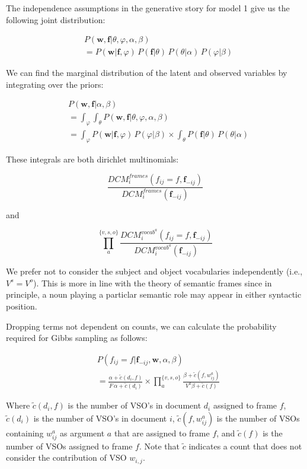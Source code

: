 \documentclass[11pt,twocolumn,DIV=11]{scrartcl}
\renewcommand\phi\varphi
\begin{document}
The independence assumptions in the generative story for model 1 give us the 
following joint distribution:

\begin{align*}
&P(\mathbf{w},\mathbf{f}|\theta,\phi,\alpha,\beta)\\
&=P(\mathbf{w}|\mathbf{f},\phi)\,P(\mathbf{f}|\theta)\,P(\theta|\alpha)\,P(\phi|\beta)
\end{align*}

We can find the marginal distribution of the latent and observed variables by
integrating over the priors:

\begin{align*}
& P(\mathbf{w},\mathbf{f}|\alpha,\beta)\\
&=\int_\phi\int_\theta P(\mathbf{w},\mathbf{f}|\theta,\phi,\alpha,\beta)\\
&=     \int_\phi P(\mathbf{w}|\mathbf{f},\phi )\,P(\phi|\beta)
\times \int_\theta P(\mathbf{f}|\theta)\,P(\theta|\alpha)
\end{align*}

These integrals are both dirichlet multinomials:

\[
\frac{DCM_i^{frames}(f_{ij}=f, \mathbf{f}_{-ij})}{DCM_i^{frames}(\mathbf{f}_{-ij})}
\]

and

\[
\prod_a^{\{v,s,o\}}\frac{DCM_i^{vocab^a}(f_{ij}=f, \mathbf{f}_{-ij})}{DCM_i^{vocab^a}(\mathbf{f}_{-ij})}
\]

We prefer not to consider the subject and object vocabularies independently 
(i.e., $V^s = V^o$). This is more in line with the theory of semantic frames 
since in principle, a noun playing a particlar semantic role may appear in either 
syntactic position.

Dropping terms not dependent on counts, we can calculate the probability 
required for Gibbs sampling as follows:

\begin{align}
& P(f_{ij} = f|\mathbf{f}_{-ij},\mathbf{w}, \alpha,\beta)\nonumber\\
&=\frac{\alpha + \tilde c(d_i,f)}{F\,\alpha + \tilde c(d_i)}
\times \prod_a^{\{v,s,o\}}\frac{\beta+\tilde c(f,w_{ij}^a)}{V^a\beta+\tilde c(f)}
\end{align}

Where $\tilde c (d_i, f)$ is the number of VSO's in document $d_i$ assigned to frame $f$,
$\tilde c(d_i)$ is the number of VSO's in document $i$,
$\tilde c(f,w_{ij}^a)$ is the number of VSOs containing $w_{ij}^a$ as argument $a$ that are
assigned to frame $f$, and
$\tilde c(f)$ is the number of VSOs assigned to frame $f$.
Note that $\tilde c$ indicates a count that does not consider the contribution of 
VSO $w_{i,j}$.
\end{document}
